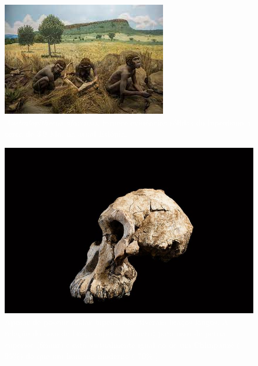 \documentclass[aspectratio=169]{beamer} %
\begin{document}
{\begin{frame}
    \begin{minipage}{0.5\textwidth}
	    \begin{figure}
	\centering
        \includegraphics[scale=0.5]{images/australopitecus5.jpeg} %
		    \caption{\textcolor{white}{\textit{ Australopithecus afarensis}, fornece evidências sólidas do bipedismo a cerca de 3.9 Ma, na atual Etiópia.}} %
	    \end{figure}
    \end{minipage}%
		\pause
    \begin{minipage}{0.5\textwidth}
	    \begin{figure}
        \centering
        \includegraphics[scale=0.2]{images/australopitecus2.jpg} %
		    \caption{\textcolor{white}{Apesar de possuir andar bípede, eles tiveram braços longos. A relação do osso de braço superior (úmero) para osso de perna superior (fêmur) e está virtualmente igual ao de um Chimpanzé ($95\%$) do que um humano moderno ( $70\%$.) }} %
	    \end{figure}
    \end{minipage}

\flushright
		\textcolor{blue}{\citep{Higham2011}}
		
	\end{frame}
}
\end{document}
